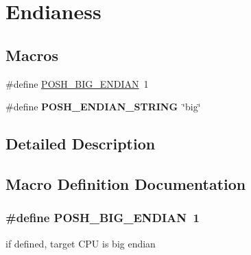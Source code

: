 \hypertarget{group__EndianessSymbols}{}\section{Endianess}
\label{group__EndianessSymbols}
\subsection*{Macros}
\begin{DoxyCompactItemize}
\item 
\#define \hyperlink{group__EndianessSymbols_gaa8105a92955da94932bfe81f93420e5a}{P\+O\+S\+H\+\_\+\+B\+I\+G\+\_\+\+E\+N\+D\+I\+AN}~1
\item 
\#define {\bfseries P\+O\+S\+H\+\_\+\+E\+N\+D\+I\+A\+N\+\_\+\+S\+T\+R\+I\+NG}~\char`\"{}big\char`\"{}\hypertarget{group__EndianessSymbols_gac4e65a55ba1ef10dac63ba7418a67a1d}{}\label{group__EndianessSymbols_gac4e65a55ba1ef10dac63ba7418a67a1d}

\end{DoxyCompactItemize}


\subsection{Detailed Description}


\subsection{Macro Definition Documentation}
\subsubsection[{\texorpdfstring{P\+O\+S\+H\+\_\+\+B\+I\+G\+\_\+\+E\+N\+D\+I\+AN}{POSH_BIG_ENDIAN}}]{\setlength{\rightskip}{0pt plus 5cm}\#define P\+O\+S\+H\+\_\+\+B\+I\+G\+\_\+\+E\+N\+D\+I\+AN~1}\hypertarget{group__EndianessSymbols_gaa8105a92955da94932bfe81f93420e5a}{}\label{group__EndianessSymbols_gaa8105a92955da94932bfe81f93420e5a}
if defined, target C\+PU is big endian 